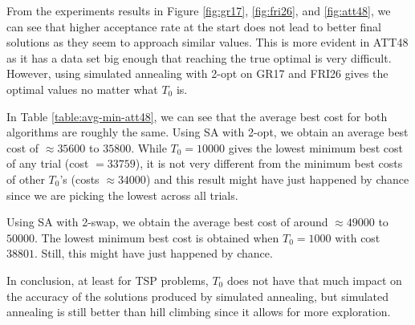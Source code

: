 From the experiments results in Figure \ref{fig:gr17}, \ref{fig:fri26}, and \ref{fig:att48}, we can see that higher acceptance rate at the start does not lead to better final solutions as they seem to approach similar values. This is more evident in ATT48 as it has a data set big enough that reaching the true optimal is very difficult. However, using simulated annealing with 2-opt on GR17 and FRI26 gives the optimal values no matter what \(T_0\) is.

In Table \ref{table:avg-min-att48}, we can see that the average best cost for both algorithms are roughly the same. Using SA with 2-opt, we obtain an average best cost of \(\approx 35600\) to \(35800\). While \(T_0=10000\) gives the lowest minimum best cost of any trial (cost \(= 33759\)), it is not very different from the minimum best costs of other \(T_0\)'s (costs \(\approx 34000\)) and this result might have just happened by chance since we are picking the lowest across all trials.

Using SA with 2-swap, we obtain the average best cost of around \(\approx 49000\) to \(50000\). The lowest minimum best cost is obtained when \(T_0 = 1000\) with cost \(38801\). Still, this might have just happened by chance.

In conclusion, at least for TSP problems, \(T_0\) does not have that much impact on the accuracy of the solutions produced by simulated annealing, but simulated annealing is still better than hill climbing since it allows for more exploration.
